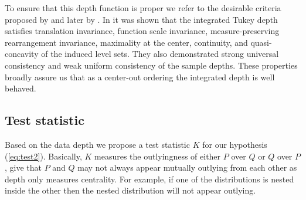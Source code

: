 \documentclass[12pt]{article}
\begin{document}
To ensure that this depth function is proper we refer to the desirable criteria proposed by \citet{zuo} and later by \citet{mosler}. In \citet{nagy} it was shown that the integrated Tukey depth satisfies translation invariance, function scale invariance, measure-preserving rearrangement invariance, maximality at the center, continuity, and quasi-concavity of the induced level sets. They also demonstrated strong universal consistency and weak uniform consistency of the sample depths. These properties broadly assure us that as a center-out ordering the integrated depth is well behaved.

\subsection{Test statistic} \label{test}
Based on the data depth we propose a test statistic $K$ for our hypothesis (\ref{eq:test2}). Basically, $K$ measures the outlyingness of either $P$ over $Q$ or $Q$ over $P$, give that  $P$ and $Q$ may not always appear mutually outlying from each other as depth only measures centrality. For example, if one of the distributions is nested inside the other then the nested distribution will not appear outlying.
\end{document}
